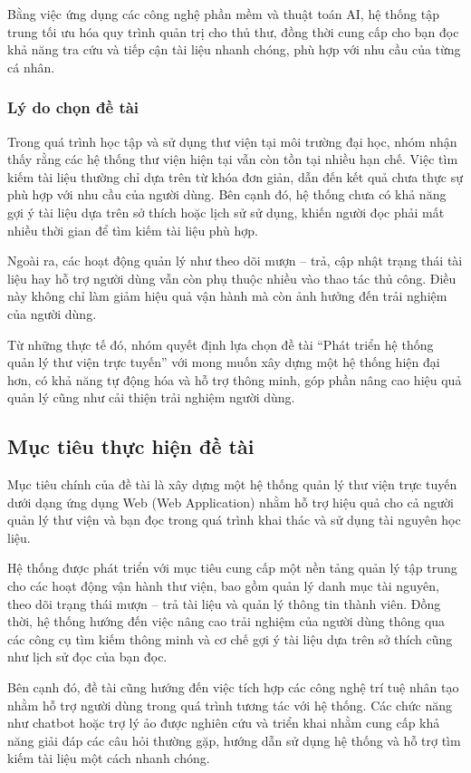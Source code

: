 Bằng việc ứng dụng các công nghệ phần mềm và thuật toán AI, hệ thống tập trung tối ưu hóa quy trình quản trị cho thủ thư, đồng thời cung cấp cho bạn đọc khả năng tra cứu và tiếp cận tài liệu nhanh chóng, phù hợp với nhu cầu của từng cá nhân.

\subsubsection{Lý do chọn đề tài}

Trong quá trình học tập và sử dụng thư viện tại môi trường đại học, nhóm nhận thấy rằng các hệ thống thư viện hiện tại vẫn còn tồn tại nhiều hạn chế. Việc tìm kiếm tài liệu thường chỉ dựa trên từ khóa đơn giản, dẫn đến kết quả chưa thực sự phù hợp với nhu cầu của người dùng. Bên cạnh đó, hệ thống chưa có khả năng gợi ý tài liệu dựa trên sở thích hoặc lịch sử sử dụng, khiến người đọc phải mất nhiều thời gian để tìm kiếm tài liệu phù hợp.

Ngoài ra, các hoạt động quản lý như theo dõi mượn – trả, cập nhật trạng thái tài liệu hay hỗ trợ người dùng vẫn còn phụ thuộc nhiều vào thao tác thủ công. Điều này không chỉ làm giảm hiệu quả vận hành mà còn ảnh hưởng đến trải nghiệm của người dùng.

Từ những thực tế đó, nhóm quyết định lựa chọn đề tài “Phát triển hệ thống quản lý thư viện trực tuyến” với mong muốn xây dựng một hệ thống hiện đại hơn, có khả năng tự động hóa và hỗ trợ thông minh, góp phần nâng cao hiệu quả quản lý cũng như cải thiện trải nghiệm người dùng.

\subsection{Mục tiêu thực hiện đề tài}

Mục tiêu chính của đề tài là xây dựng một hệ thống quản lý thư viện trực tuyến dưới dạng ứng dụng Web (Web Application) nhằm hỗ trợ hiệu quả cho cả người quản lý thư viện và bạn đọc trong quá trình khai thác và sử dụng tài nguyên học liệu.

Hệ thống được phát triển với mục tiêu cung cấp một nền tảng quản lý tập trung cho các hoạt động vận hành thư viện, bao gồm quản lý danh mục tài nguyên, theo dõi trạng thái mượn – trả tài liệu và quản lý thông tin thành viên. Đồng thời, hệ thống hướng đến việc nâng cao trải nghiệm của người dùng thông qua các công cụ tìm kiếm thông minh và cơ chế gợi ý tài liệu dựa trên sở thích cũng như lịch sử đọc của bạn đọc.

Bên cạnh đó, đề tài cũng hướng đến việc tích hợp các công nghệ trí tuệ nhân tạo nhằm hỗ trợ người dùng trong quá trình tương tác với hệ thống. Các chức năng như chatbot hoặc trợ lý ảo được nghiên cứu và triển khai nhằm cung cấp khả năng giải đáp các câu hỏi thường gặp, hướng dẫn sử dụng hệ thống và hỗ trợ tìm kiếm tài liệu một cách nhanh chóng.

